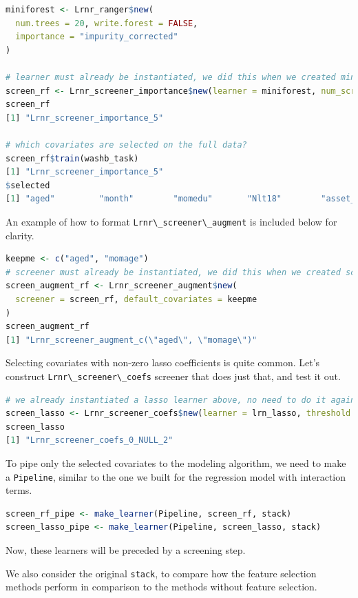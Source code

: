 \documentclass[
  12pt, krantz2,
]{book}
\newcommand{\passthrough}[1]{#1}
\theoremstyle{definition}
\theoremstyle{definition}
\theoremstyle{definition}
\newcommand{\1}{\mathbbm{1}}
\begin{document}
\begin{lstlisting}[language=R]
miniforest <- Lrnr_ranger$new(
  num.trees = 20, write.forest = FALSE,
  importance = "impurity_corrected"
)

# learner must already be instantiated, we did this when we created miniforest
screen_rf <- Lrnr_screener_importance$new(learner = miniforest, num_screen = 5)
screen_rf
[1] "Lrnr_screener_importance_5"

# which covariates are selected on the full data?
screen_rf$train(washb_task)
[1] "Lrnr_screener_importance_5"
$selected
[1] "aged"         "month"        "momedu"       "Nlt18"        "asset_refrig"
\end{lstlisting}

An example of how to format \passthrough{\lstinline!Lrnr\_screener\_augment!} is included below for
clarity.

\begin{lstlisting}[language=R]
keepme <- c("aged", "momage")
# screener must already be instantiated, we did this when we created screen_rf
screen_augment_rf <- Lrnr_screener_augment$new(
  screener = screen_rf, default_covariates = keepme
)
screen_augment_rf
[1] "Lrnr_screener_augment_c(\"aged\", \"momage\")"
\end{lstlisting}

Selecting covariates with non-zero lasso coefficients is quite common. Let's
construct \passthrough{\lstinline!Lrnr\_screener\_coefs!} screener that does just that, and test it
out.

\begin{lstlisting}[language=R]
# we already instantiated a lasso learner above, no need to do it again
screen_lasso <- Lrnr_screener_coefs$new(learner = lrn_lasso, threshold = 0)
screen_lasso
[1] "Lrnr_screener_coefs_0_NULL_2"
\end{lstlisting}

To pipe only the selected covariates to the modeling algorithm, we need to
make a \passthrough{\lstinline!Pipeline!}, similar to the one we built for the regression model with
interaction terms.

\begin{lstlisting}[language=R]
screen_rf_pipe <- make_learner(Pipeline, screen_rf, stack)
screen_lasso_pipe <- make_learner(Pipeline, screen_lasso, stack)
\end{lstlisting}

Now, these learners will be preceded by a screening step.

We also consider the original \passthrough{\lstinline!stack!}, to compare how the feature selection
methods perform in comparison to the methods without feature selection.
\end{document}
